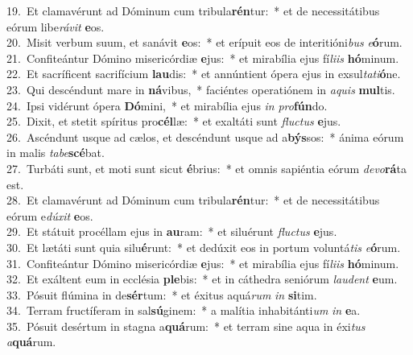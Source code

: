 {19.~}Et clamavérunt ad Dóminum cum tribula\textbf{rén}tur:~* et de necessitátibus eórum libe\textit{rá}\textit{vit} \textbf{e}os.\\
{20.~}Misit verbum suum, et sanávit \textbf{e}os:~* et erípuit eos de interitióni\textit{bus} \textit{e}\textbf{ó}rum.\\
{21.~}Confiteántur Dómino misericórdiæ \textbf{e}jus:~* et mirabília ejus fí\textit{li}\textit{is} \textbf{hó}minum.\\
{22.~}Et sacríficent sacrifícium \textbf{lau}dis:~* et annúntient ópera ejus in exsul\textit{ta}\textit{ti}\textbf{ó}ne.\\
{23.~}Qui descéndunt mare in \textbf{ná}vibus,~* faciéntes operatiónem in \textit{a}\textit{quis} \textbf{mul}tis.\\
{24.~}Ipsi vidérunt ópera \textbf{Dó}mini,~* et mirabília ejus \textit{in} \textit{pro}\textbf{fún}do.\\
{25.~}Dixit, et stetit spíritus pro\textbf{cél}læ:~* et exaltáti sunt \textit{flu}\textit{ctus} \textbf{e}jus.\\
{26.~}Ascéndunt usque ad cælos, et descéndunt usque ad a\textbf{býs}sos:~* ánima eórum in malis \textit{ta}\textit{be}\textbf{scé}bat.\\
{27.~}Turbáti sunt, et moti sunt sicut \textbf{é}brius:~* et omnis sapiéntia eórum \textit{de}\textit{vo}\textbf{rá}ta est.\\
{28.~}Et clamavérunt ad Dóminum cum tribula\textbf{rén}tur:~* et de necessitátibus eórum e\textit{dú}\textit{xit} \textbf{e}os.\\
{29.~}Et státuit procéllam ejus in \textbf{au}ram:~* et siluérunt \textit{flu}\textit{ctus} \textbf{e}jus.\\
{30.~}Et lætáti sunt quia silu\textbf{é}runt:~* et dedúxit eos in portum voluntá\textit{tis} \textit{e}\textbf{ó}rum.\\
{31.~}Confiteántur Dómino misericórdiæ \textbf{e}jus:~* et mirabília ejus fí\textit{li}\textit{is} \textbf{hó}minum.\\
{32.~}Et exáltent eum in ecclésia \textbf{ple}bis:~* et in cáthedra seniórum \textit{lau}\textit{dent} \textbf{e}um.\\
{33.~}Pósuit flúmina in de\textbf{sér}tum:~* et éxitus aquá\textit{rum} \textit{in} \textbf{si}tim.\\
{34.~}Terram fructíferam in sal\textbf{sú}ginem:~* a malítia inhabitánti\textit{um} \textit{in} \textbf{e}a.\\
{35.~}Pósuit desértum in stagna a\textbf{quá}rum:~* et terram sine aqua in éxi\textit{tus} \textit{a}\textbf{quá}rum.\\
